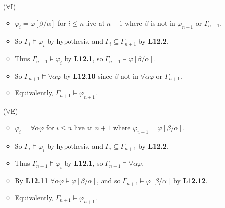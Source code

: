 \documentclass[a4paper, 11pt]{article} %
\newcommand{\qt}[2]{#1 #2} %
\newcommand{\unisub}[2]{[#1/#2]}
\renewcommand{\models}{\vDash}
\def\metaA{\ensuremath{\varphi}}
\begin{document}
\begin{enumerate}[labelsep=.1in]
  \item[($\forall$I)] %
    \begin{itemize}
      \item $\metaA_i=\metaA\unisub{\beta}{\alpha}$ for $i\leq n$ live at $n+1$ where $\beta$ is not in $\metaA_{n+1}$ or $\Gamma_{n+1}$. 
      \item So $\Gamma_i\models\metaA_i$ by hypothesis, and $\Gamma_i\subseteq\Gamma_{n+1}$ by \textbf{L12.2}.
      \item Thus $\Gamma_{n+1}\models\metaA_i$ by \textbf{L12.1}, so $\Gamma_{n+1}\models\metaA\unisub{\beta}{\alpha}$.
      \item So $\Gamma_{n+1}\models \qt{\forall}{\alpha}\metaA$ by \textbf{L12.10} since $\beta$ not in $\qt{\forall}{\alpha}\metaA$ or $\Gamma_{n+1}$.
      \item Equivalently, $\Gamma_{n+1}\models \metaA_{n+1}$.
    \end{itemize}
  \item[($\forall$E)] %
    \begin{itemize}
      \item $\metaA_i=\qt{\forall}{\alpha}\metaA$ for $i\leq n$ live at $n+1$ where $\metaA_{n+1}=\metaA\unisub{\beta}{\alpha}$.
      \item So $\Gamma_i\models\metaA_i$ by hypothesis, and $\Gamma_i\subseteq\Gamma_{n+1}$ by \textbf{L12.2}.
      \item Thus $\Gamma_{n+1}\models\metaA_i$ by \textbf{L12.1}, so $\Gamma_{n+1}\models \qt{\forall}{\alpha}\metaA$.
      \item By \textbf{L12.11} $\qt{\forall}{\alpha}\metaA\models\metaA\unisub{\beta}{\alpha}$, and so $\Gamma_{n+1}\models\metaA\unisub{\beta}{\alpha}$ by \textbf{L12.12}.
      \item Equivalently, $\Gamma_{n+1}\models \metaA_{n+1}$.
    \end{itemize}
\end{enumerate}
\end{document}
